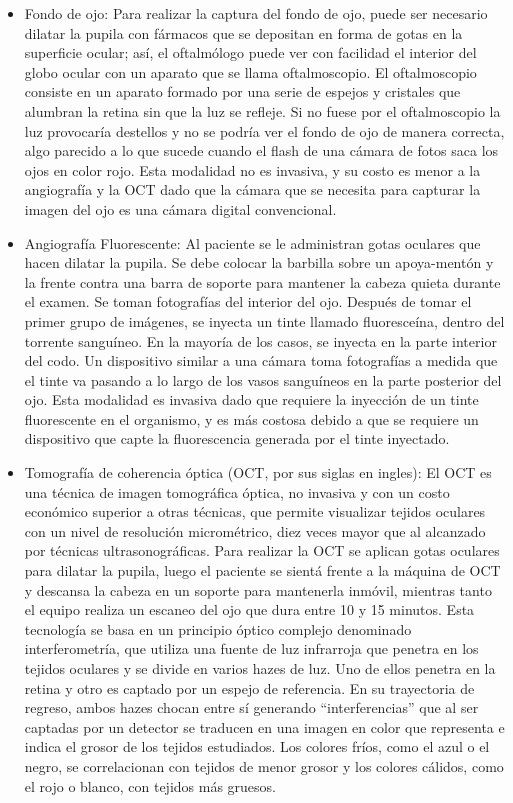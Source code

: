 \begin{itemize}
	\item Fondo de ojo: Para realizar la captura del fondo de ojo, puede ser necesario dilatar la pupila con f\'armacos que se depositan en forma de gotas en la superficie ocular; as\'i, el oftalm\'ologo puede ver con facilidad el interior del globo ocular con un aparato que se llama oftalmoscopio. El oftalmoscopio consiste en un aparato formado por una serie de espejos y cristales que alumbran la retina sin que la luz se refleje. Si no fuese por el oftalmoscopio la luz provocar\'ia destellos y no se podr\'ia ver el fondo de ojo de manera correcta, algo parecido a lo que sucede cuando el flash de una c\'amara de fotos saca los ojos en color rojo. Esta modalidad no es invasiva, y su costo es menor a la angiograf\'ia y la OCT dado que la cámara que se necesita para capturar la imagen del ojo es una c\'amara digital convencional.
\item Angiograf\'ia Fluorescente: Al paciente se le administran gotas oculares que hacen dilatar la pupila. Se debe colocar la barbilla sobre un apoya-ment\'on y la frente contra una barra de soporte para mantener la cabeza quieta durante el examen. Se toman fotograf\'ias del interior del ojo. Despu\'es de tomar el primer grupo de im\'agenes, se inyecta un tinte llamado fluoresce\'ina, dentro del  torrente sangu\'ineo. En la mayor\'ia de los casos, se inyecta en la parte interior del codo. Un dispositivo similar a una c\'amara toma fotograf\'ias a medida que el tinte va pasando a lo largo de los vasos sangu\'ineos en la parte posterior del ojo. Esta modalidad es invasiva dado que requiere la inyecci\'on de  un tinte fluorescente en el organismo, y es m\'as costosa debido a que se requiere un dispositivo que capte la fluorescencia generada por el tinte inyectado.
\item Tomograf\'ia de coherencia \'optica (OCT, por sus siglas en ingles): El OCT es una t\'ecnica de imagen tomogr\'afica \'optica, no invasiva y con un costo econ\'omico superior a otras t\'ecnicas, que permite visualizar tejidos oculares con un nivel de resoluci\'on microm\'etrico, diez veces mayor que al alcanzado por t\'ecnicas ultrasonogr\'aficas. Para realizar la OCT se aplican  gotas oculares para dilatar la pupila, luego el paciente se sient\'a frente a la m\'aquina de OCT y descansa  la cabeza en un soporte para mantenerla inm\'ovil, mientras tanto el equipo realiza un escaneo del ojo que dura entre 10 y 15 minutos. Esta tecnolog\'ia se basa en un principio \'optico complejo denominado interferometr\'ia, que utiliza una fuente de luz infrarroja que penetra en los tejidos oculares y se divide en varios hazes de luz. Uno de ellos penetra en la retina y otro es captado por un espejo de referencia. En su trayectoria de regreso, ambos hazes chocan entre s\'i generando “interferencias” que al ser captadas por un detector se traducen en una imagen en color que representa e indica el grosor de los tejidos estudiados. Los colores fr\'ios, como el azul o el negro, se correlacionan con tejidos de menor grosor y los colores c\'alidos, como el rojo o blanco, con tejidos m\'as gruesos. 

\end{itemize}


